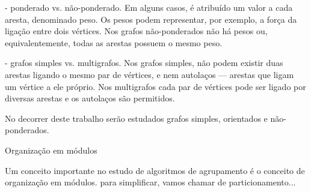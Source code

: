 - ponderado vs. não-ponderado. Em alguns casos, é atribuído um valor a cada aresta, denominado peso. Os pesos podem representar, por exemplo, a força da ligação entre dois vértices. Nos grafos não-ponderados não há pesos ou, equivalentemente, todas as arestas possuem o mesmo peso.

- grafos simples vs. multigrafos. Nos grafos simples, não podem existir duas arestas ligando o mesmo par de vértices, e nem autolaços --- arestas que ligam um vértice a ele próprio. Nos multigrafos cada par de vértices pode ser ligado por diversas arestas e os autolaços são permitidos.

No decorrer deste trabalho serão estudados grafos simples, orientados e não-ponderados. %

\begin{section}{Organização em módulos}

Um conceito importante no estudo de algoritmos de agrupamento é o conceito de organização em módulos. 
para simplificar, vamos chamar de particionamento...

\end{section}

